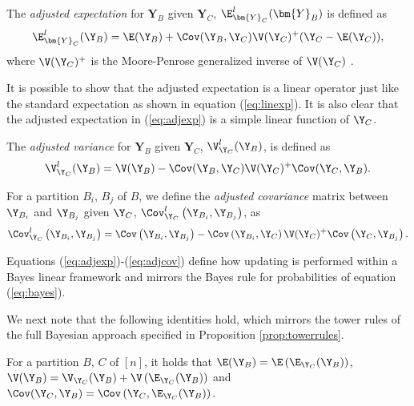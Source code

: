 \begin{definition}
The \textit{adjusted expectation} for $\bm{Y}_B$ given $\bm{Y}_C$, $\E_{\bm{Y}_C}^l(\bm{Y}_B)$ is defined as
\begin{equation}
\label{eq:adjexp}
\E_{\bm{Y}_C}^l(\Y_B)=\E(\Y_B)+\Cov(\Y_B,\Y_C)\V(\Y_C)^+(\Y_C-\E(\Y_C)),
\end{equation}
where $\V(\Y_C)^+$ is the Moore-Penrose generalized inverse of $\V(\Y_C)$ \citep[see e.g. Chapter 11 of][]{Goldstein2007}.
\end{definition}

 It is possible to show that the adjusted expectation is a linear operator just like the standard expectation as shown in equation (\ref{eq:linexp}). It is also clear that the adjusted expectation in (\ref{eq:adjexp}) is a simple linear function of $\Y_C$.
 
\begin{definition} 
The \textit{adjusted variance} for $\bm{Y}_B$ given $\bm{Y}_C$, $\V_{\Y_C}^l(\Y_B)$, is defined as
\begin{equation}
\label{eq:adjvar}
\V_{\Y_C}^l(\Y_B)=\V(\Y_B)-\Cov(\Y_B,\Y_C)\V(\Y_C)^+\Cov(\Y_C,\Y_B).
\end{equation}
\end{definition}
\begin{definition}
For a partition $B_i$, $B_j$ of $B$, we define the \textit{adjusted covariance} matrix between $\Y_{B_i}$ and $\Y_{B_j}$ given $\Y_C$, $\Cov_{\Y_C}^l\left(\Y_{B_i},\Y_{B_j}\right)$, as
\begin{equation}
\label{eq:adjcov}
\Cov_{\Y_C}^l\left(\Y_{B_i},\Y_{B_j}\right)=\Cov\left(\Y_{B_i},\Y_{B_j}\right)-\Cov\left(\Y_{B_i},\Y_{C}\right)\V(\Y_C)^+\Cov\left(\Y_C,\Y_{B_j}\right).
\end{equation}
\end{definition}

Equations (\ref{eq:adjexp})-(\ref{eq:adjcov}) define how updating is performed within a Bayes linear framework and mirrors the Bayes rule for probabilities of equation (\ref{eq:bayes}).

We next note that the following identities hold, which mirrors the tower rules of the full Bayesian approach specified in Proposition \ref{prop:towerrules}.
\begin{proposition}
\label{prop:linearrules}
For a partition $B$, $C$ of $[n]$, it holds that
$
\E(\Y_{B})=\E\left(\E_{\Y_C}(\Y_B)\right)$, $
\V(\Y_B)=\V_{\Y_C}(\Y_B)+\V\left(\E_{\Y_C}(\Y_B)\right)$ and 
$\Cov(\Y_C,\Y_B)=\Cov\left(\Y_C,\E_{\Y_C}(\Y_B)\right)$.
\end{proposition}

